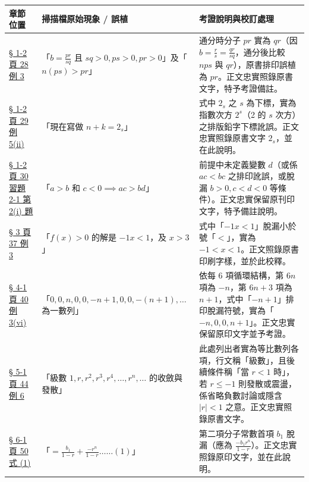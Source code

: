 \documentclass[a4paper,12pt,twoside]{article}
\begin{document}
\begin{table}[H]
\centering
\small
\renewcommand{\arraystretch}{1.35}
\begin{tabularx}{\textwidth}{|p{3.2cm}|p{3.6cm}|X|}
\hline
\textbf{章節位置} & \textbf{掃描檔原始現象 / 誤植} & \textbf{考證說明與校訂處理} \\ \hline

\hyperref[note:b2-ch2-p28-ex3-pr]{§ 1-2 頁 28 例 3} & 
「$b = \frac{pr}{sq}$ 且 $sq>0, ps>0, pr>0$」及「$n(ps)>pr$」 & 
通分時分子 $pr$ 實為 $qr$（因 $b=\frac{r}{s}=\frac{qr}{sq}$，通分後比較 $nps$ 與 $qr$），原書排印誤植為 $pr$。正文忠實照錄原書文字，特予考證備註。 \\ \hline

\hyperref[note:b2-ch2-p29-ex5-subscript]{§ 1-2 頁 29 例 5(ii)} & 
「現在寫做 $n+k=2_s$」 & 
式中 $2_s$ 之 $s$ 為下標，實為指數次方 $2^s$（2 的 $s$ 次方）之排版鉛字下標訛誤。正文忠實照錄原書文字 $2_s$，並在此說明。 \\ \hline

\hyperref[note:b2-ch2-p30-ex2-1-q2i]{§ 1-2 頁 30 習題 2-1 第 2(i) 題} & 
「$a>b \text{ 和 } c<0 \implies ac>bd$」 & 
前提中未定義變數 $d$（或係 $ac<bc$ 之排印訛誤，或脫漏 $b>0, c<d<0$ 等條件）。正文忠實保留原刊印文字，特予備註說明。 \\ \hline

\hyperref[note:b2-ch2-p37-ex3-typo]{§ 3 頁 37 例 3} & 
「$f(x)>0$ 的解是 $-1x<1$，及 $x>3$」 & 
式中「$-1x<1$」脫漏小於號「$<$」，實為 $-1<x<1$。正文照錄原書印刷字樣，並於此校釋。 \\ \hline

\hyperref[note:b2-ch2-p40-ex3-vi]{§ 4-1 頁 40 例 3(vi)} & 
「$0, 0, n, 0, 0, -n+1, 0, 0, -(n+1), \dots$ 為一數列」 & 
依每 6 項循環結構，第 $6n$ 項為 $-n$，第 $6n+3$ 項為 $n+1$，式中「$-n+1$」排印脫漏符號，實為「$-n, 0, 0, n+1$」。正文忠實保留原印文字並予考證。 \\ \hline

\hyperref[note:b2-ch2-p44-ex6-series-term]{§ 5-1 頁 44 例 6} & 
「級數 $1, r, r^2, r^3, r^4, \dots, r^n, \dots$ 的收斂與發散」 & 
此處列出者實為等比數列各項，行文稱「級數」，且後續條件稱「當 $r<1$ 時」，若 $r\le -1$ 則發散或震盪，係省略負數討論或隱含 $|r|<1$ 之意。正文忠實照錄原書文字。 \\ \hline

\hyperref[note:b2-ch2-p50-eq1-b1]{§ 6-1 頁 50 式 (1)} & 
「$= \frac{b_1}{1-r} + \frac{-r^n}{1-r} \dots\dots(1)$」 & 
第二項分子常數首項 $b_1$ 脫漏（應為 $\frac{-b_1 r^n}{1-r}$）。正文忠實照錄原印文字，並在此說明。 \\ \hline


\end{tabularx}
\end{table}
\end{document}
